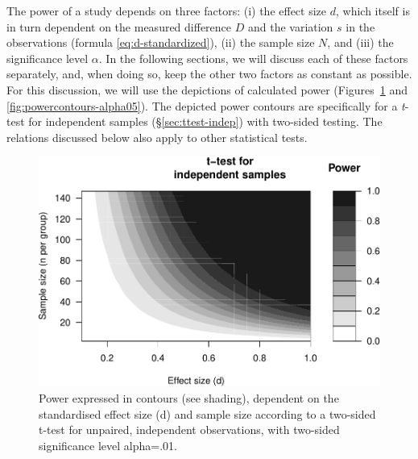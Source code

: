 \documentclass[
]{book}
\begin{document}
The power of a study depends on three factors: (i) the effect
size \(d\), which itself is in turn dependent on the measured difference
\(D\) and the variation \(s\) in the observations
(formula \eqref{eq:d-standardized}), (ii) the sample size \(N\), and (iii)
the significance level \(\alpha\). In the following sections, we will
discuss each of these factors separately, and, when doing so, keep the other
two factors as constant as possible. For this discussion, we will use the
depictions of calculated power
(Figures~\ref{fig:powercontours-alpha01} and
\ref{fig:powercontours-alpha05}). The depicted power contours are specifically
for a \emph{t}-test for independent samples
(§\ref{sec:ttest-indep}) with two-sided testing.
The relations discussed below also apply to other statistical
tests.

\begin{figure}
\centering
\includegraphics{QMS-EN_files/figure-latex/powercontours-alpha01-1.pdf}
\caption{\label{fig:powercontours-alpha01}Power expressed in contours (see shading), dependent on the standardised effect size (d) and sample size according to a two-sided t-test for unpaired, independent observations, with two-sided significance level alpha=.01.}
\end{figure}
\end{document}
